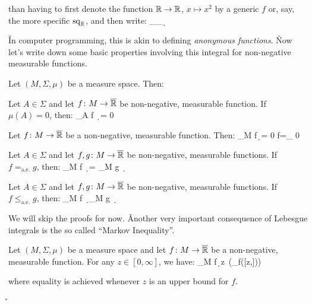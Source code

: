 than having to first denote the function $\mathbb{R}\to\mathbb{R}$, $x\mapsto x^2$ by a generic $f$ or, say, the more specific
$\mathrm{sq}_{\mathbb{R}}$, and then write:
\bse
\int_\R{}_{\R}\, \d \mu
\ese

\v

In computer programming, this is akin to defining \emph{anonymous functions}. \v

Now let's write down some basic properties involving this integral for non-negative measurable functions.

\bt[]
Let $(M,\Sigma,\mu)$ be a measure space. Then:
\ben[label=(\roman*)]
\item Let $A\in\Sigma$ and let $f\colon M\to\overline{\mathbb{R}}$ be non-negative, measurable function. If $\mu(A)=0$, then:
\bse
\displaystyle\int_A\! f \, \d \mu = 0
\ese

\item Let $f\colon M\to\overline{\mathbb{R}}$ be a non-negative, measurable function. Then:
\bse
\int_M\! f\, \d \mu = 0 \quad \Leftrightarrow \quad f=_{} 0
\ese

\item Let $A\in\Sigma$ and let $f,g\colon M\to\overline{\mathbb{R}}$ be non-negative, measurable functions. If
$f=_{\mathrm{a.e.}} g$, then:
\bse
\displaystyle\int_M\! f \, \d \mu = \int_M\! g \, \d \mu
\ese

\item Let $A\in\Sigma$ and let $f,g\colon M\to\overline{\mathbb{R}}$ be non-negative, measurable functions. If
$f\leq_{\mathrm{a.e.}}g$, then:
\bse
\displaystyle\int_M\! f \, \d \mu \leq \int_M\! g \, \d \mu
\ese
\een
\et

We will skip the proofs for now. \v

Another very important consequence of Lebesgue integrals is the so called ``Markov Inequality''.

Let $(M,\Sigma,\mu)$ be a measure space and let $f\colon M\to\overline{\mathbb{R}}$ be a non-negative, measurable function. For
any $z\in [0,\infty]$, we have:
\bse
\int_M\! f\, \d \mu \geq z\, \mu(\preim_f([z,\infty]))
\ese

where equality is achieved whenever $z$ is an upper bound for $f$.
\et

\v

\begin{center}
\end{center}

